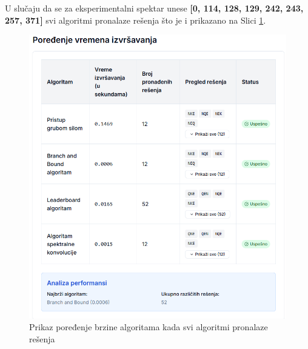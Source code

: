 \documentclass[12pt,oneside]{memoir}
\begin{document}
U slučaju da se za eksperimentalni spektar unese \textbf{[0, 114, 128, 129, 242, 243, 257, 371]} svi algoritmi pronalaze rešenja što je i prikazano na Slici \ref{fig:comparison_all_solution}.
\begin{figure}[H]
\centering
\includegraphics[width=1\textwidth]{images/comparison_all_solution.png}
\caption{Prikaz poređenje brzine algoritama kada svi algoritmi pronalaze rešenja}
\label{fig:comparison_all_solution}
\end{figure}
\end{document}

